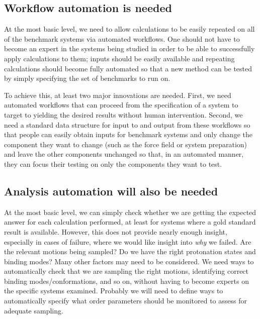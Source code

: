 \documentclass[aps,pre,twocolumn,nofootinbib,superscriptaddress,10pt, final,tightenlines]{revtex4-1}
\begin{document}
\subsection{Workflow automation is needed}
At the most basic level, we need to allow calculations to be easily repeated on all of the benchmark systems via automated workflows.  
One should not have to become an expert in the systems being studied in order to be able to successfully apply calculations to them; inputs should be easily available and repeating calculations should become fully automated so that a new method can be tested by simply specifying the set of benchmarks to run on.

To achieve this, at least two major innovations are needed. 
First, we need automated workflows that can proceed from the specification of a system to target to yielding the desired results without human intervention. 
Second, we need a standard data structure for input to and output from these workflows so that people can easily obtain inputs for benchmark systems and only change the component they want to change (such as the force field or system preparation) and leave the other components unchanged so that, in an automated manner, they can focus their testing on only the components they want to test. 

\subsection{Analysis automation will also be needed}
At the most basic level, we can simply check whether we are getting the expected answer for each calculation performed, at least for systems where a gold standard result is available. 
However, this does not provide nearly enough insight, especially in cases of failure, where we would like insight into \emph{why} we failed. 
Are the relevant motions being sampled? 
Do we have the right protonation states and binding modes? 
Many other factors may need to be considered.
We need ways to automatically check that we are sampling the right motions, identifying correct binding modes/conformations, and so on, without having to become experts on the specific systems examined. 
Probably we will need to define ways to automatically specify what order parameters should be monitored to assess for adequate sampling. 
\end{document}
